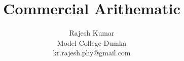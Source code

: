 \documentclass{beamer}
\begin{document}
\title{Commercial Arithematic}
\author{Rajesh Kumar \\Model College Dumka\\kr.rajesh.phy@gmail.com}
\date{}

\begin{frame}
  \titlepage
\end{frame}











\end{document}
